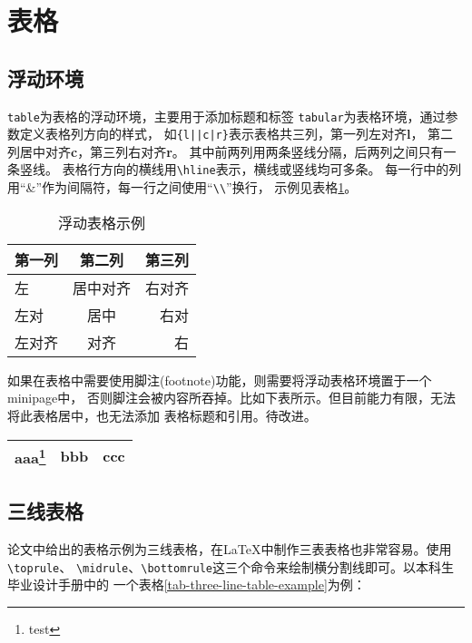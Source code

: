 \section{表格}
\label{sec-table}

\subsection{浮动环境}
\label{subsec-table-float}
\texttt{table}为表格的浮动环境，主要用于添加标题和标签
\texttt{tabular}为表格环境，通过参数定义表格列方向的样式，
如\verb+{l||c|r}+表示表格共三列，第一列左对齐{\bf l}，
第二列居中对齐{\bf c}，第三列右对齐{\bf r}。
其中前两列用两条竖线分隔，后两列之间只有一条竖线。
表格行方向的横线用\verb|\hline|表示，横线或竖线均可多条。
每一行中的列用“\&”作为间隔符，每一行之间使用“\verb|\\|”换行，
示例见表格\ref{tab-sample}。
\begin{table}
    \centering
    \caption{浮动表格示例}
    \label{tab-sample}
    \begin{tabular}{l||c|r}
        \hline
        第一列 & 第二列   & 第三列 \\ \hline \hline
        左     & 居中对齐 & 右对齐 \\ \hline
        左对   & 居中     & 右对   \\ \hline
        左对齐 & 对齐     & 右     \\ \hline
    \end{tabular}
\end{table}
如果在表格中需要使用脚注(footnote)功能，则需要将浮动表格环境置于一个minipage中，
否则脚注会被内容所吞掉。比如下表所示。但目前能力有限，无法将此表格居中，也无法添加
表格标题和引用。待改进。

\begin{minipage}[h]{\textwidth}
    \begin{tabular}{|c|c|c|}
        \hline
        aaa\footnote{test} & bbb & ccc \\
        \hline
    \end{tabular}
\end{minipage}

\subsection{三线表格}
\label{three-line-table}

论文中给出的表格示例为三线表格，在\LaTeX{}中制作三表表格也非常容易。使用\verb|\toprule|、
\verb|\midrule|、\verb|\bottomrule|这三个命令来绘制横分割线即可。以本科生毕业设计手册中的
一个表格\ref{tab-three-line-table-example}为例：

